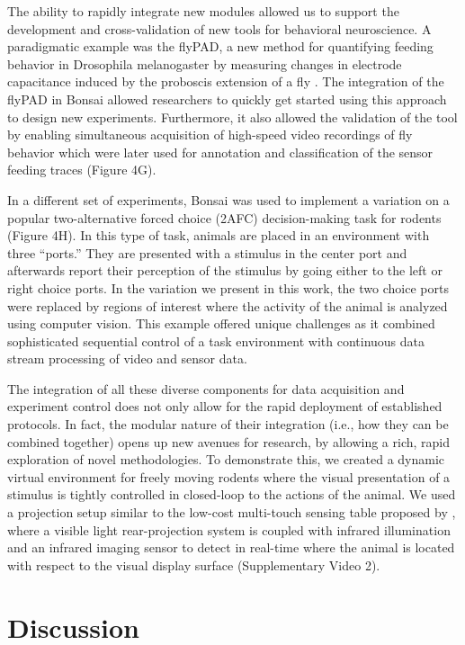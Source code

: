 The ability to rapidly integrate new modules allowed us to support the development and cross-validation of new tools for behavioral neuroscience. A paradigmatic example was the flyPAD, a new method for quantifying feeding behavior in Drosophila melanogaster by measuring changes in electrode capacitance induced by the proboscis extension of a fly \cite{Itskov2014}. The integration of the flyPAD in Bonsai allowed researchers to quickly get started using this approach to design new experiments. Furthermore, it also allowed the validation of the tool by enabling simultaneous acquisition of high-speed video recordings of fly behavior which were later used for annotation and classification of the sensor feeding traces (Figure 4G).

In a different set of experiments, Bonsai was used to implement a variation on a popular two-alternative forced choice (2AFC) decision-making task for rodents (Figure 4H). In this type of task, animals are placed in an environment with three “ports.” They are presented with a stimulus in the center port and afterwards report their perception of the stimulus by going either to the left or right choice ports. In the variation we present in this work, the two choice ports were replaced by regions of interest where the activity of the animal is analyzed using computer vision. This example offered unique challenges as it combined sophisticated sequential control of a task environment with continuous data stream processing of video and sensor data.

The integration of all these diverse components for data acquisition and experiment control does not only allow for the rapid deployment of established protocols. In fact, the modular nature of their integration (i.e., how they can be combined together) opens up new avenues for research, by allowing a rich, rapid exploration of novel methodologies. To demonstrate this, we created a dynamic virtual environment for freely moving rodents where the visual presentation of a stimulus is tightly controlled in closed-loop to the actions of the animal. We used a projection setup similar to the low-cost multi-touch sensing table proposed by \cite{Han2005}, where a visible light rear-projection system is coupled with infrared illumination and an infrared imaging sensor to detect in real-time where the animal is located with respect to the visual display surface (Supplementary Video 2).

\section{Discussion}

